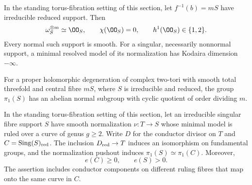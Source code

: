 
\begin{proposition}[P4.12]\hypertarget{tag-02WJ}{}\label{night:P4.12}\label{stmt:P4.12}


In the standing torus-fibration setting of this section, let $f^{-1}(b)=mS$
have irreducible reduced support. Then
\[
 \omega_S^{\otimes m}\simeq\OO_S,\qquad
 \chi(\OO_S)=0,\qquad h^1(\OO_S)\in\{1,2\}.
\]
Every normal such support is smooth. For a singular, necessarily
nonnormal support, a minimal resolved model of its normalization
has Kodaira dimension $-\infty$.
\end{proposition}

\begin{proposition}[P4R.1]\hypertarget{tag-02Y2}{}\label{night:P4R.1}\label{stmt:P4R.1}


For a proper holomorphic degeneration of complex two-tori with
smooth total threefold and central fibre $mS$, where $S$ is
irreducible and reduced, the group $\pi_1(S)$ has an abelian
normal subgroup with cyclic quotient of order dividing $m$.
\end{proposition}

\begin{proposition}[P4R.3]\hypertarget{tag-02YF}{}\label{night:P4R.3}\label{stmt:P4R.3}


In the standing torus-fibration setting of this section, let an irreducible singular fibre
support $S$ have smooth normalization $\nu:T\to S$ whose
minimal model is ruled over a curve of genus $g\ge2$.
Write $D$ for the conductor divisor on $T$ and
$C=\operatorname{Sing}(S)_{\rm red}$.
The inclusion $D_{\rm red}\to T$ induces an isomorphism on
fundamental groups, and the normalization pushout induces
$\pi_1(S)\simeq\pi_1(C)$. Moreover,
\[
 e(C)\ge0,\qquad e(S)>0.
\]
The assertion includes conductor components on different
ruling fibres that map onto the same curve in $C$.
\end{proposition}


